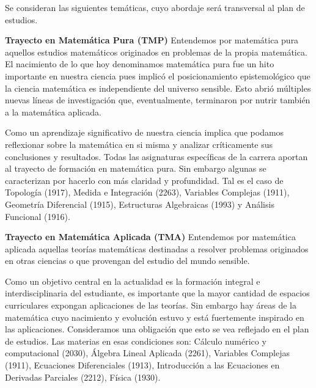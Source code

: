 \documentclass[a4paper, 12pt]{article}
\begin{document}
Se consideran las siguientes temáticas, cuyo abordaje será transversal al plan de estudios. 


\begin{description}


\item{\textbf{Trayecto en Matemática Pura (TMP)}} Entendemos por matemática pura aquellos estudios  matemáticos originados en problemas de la propia matemática. El nacimiento de lo que hoy denominamos  matemática pura fue un hito importante en  nuestra ciencia pues implicó el posicionamiento epistemológico que la ciencia matemática es independiente del universo sensible. Esto abrió múltiples nuevas líneas de investigación que, eventualmente, terminaron por nutrir también a la matemática aplicada. 

Como un aprendizaje significativo de nuestra ciencia implica que podamos reflexionar sobre la matemática en si  misma y analizar críticamente sus conclusiones y resultados. Todas las asignaturas específicas  de la carrera aportan al trayecto de formación en matemática pura. Sin embargo algunas se caracterizan por hacerlo con más claridad y profundidad. Tal es el caso de Topología (1917), Medida e Integración (2263), Variables Complejas (1911), Geometría Diferencial (1915), Estructuras Algebraicas (1993) y Análisis Funcional (1916). 

 
\item{\textbf{Trayecto en Matemática Aplicada (TMA)}} Entendemos por matemática aplicada aquellas teorías matemáticas destinadas a resolver problemas originados en  otras ciencias o que provengan del estudio  del  mundo sensible. 

Como un objetivo central en la actualidad es la formación integral e interdisciplinaria del estudiante, es importante que la mayor cantidad de  espacios curriculares  expongan aplicaciones de las teorías. Sin embargo hay áreas de la matemática cuyo  nacimiento y evolución
estuvo y está fuertemente inspirado en las aplicaciones. Consideramos una obligación que esto se vea reflejado en el plan de estudios. Las materias en esas condiciones son: Cálculo numérico y computacional (2030), Álgebra Lineal Aplicada (2261), Variables Complejas (1911), Ecuaciones Diferenciales (1913), Introducción a las Ecuaciones en Derivadas Parciales (2212), Física (1930).





\end{description}
\end{document}
